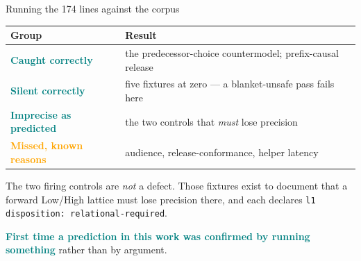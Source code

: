 \documentclass[aspectratio=169,10pt]{beamer}
\newcommand{\good}[1]{\textcolor{Teal}{\textbf{#1}}}
\newcommand{\bad}[1]{\textcolor{Orange}{\textbf{#1}}}
\newcommand{\code}[1]{\texttt{#1}}
\begin{document}
\begin{frame}{Running the 174 lines against the corpus}
  \begin{center}
  \begin{tabular}{@{}l l@{}}
  \toprule
  Group & Result \\
  \midrule
  \good{Caught correctly}       & the predecessor-choice countermodel; prefix-causal release \\
  \good{Silent correctly}       & five fixtures at zero --- a blanket-unsafe pass fails here \\
  \good{Imprecise as predicted} & the two controls that \emph{must} lose precision \\
  \bad{Missed, known reasons}   & audience, release-conformance, helper latency \\
  \bottomrule
  \end{tabular}
  \end{center}

  \vspace{1em}
  The two firing controls are \emph{not} a defect. Those fixtures exist to
  document that a forward \textsf{Low}/\textsf{High} lattice must lose precision
  there, and each declares \code{l1 disposition: relational-required}.

  \vspace{0.5em}
  \good{First time a prediction in this work was confirmed by running something}
  rather than by argument.
\end{frame}
\end{document}
